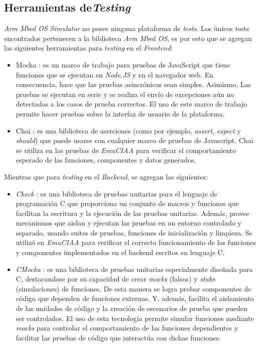 \subsection{Herramientas de\textit{Testing}}
\label{sec:TestingFrontendBackend}

\textit{Arm Mbed OS Simulator} no posee ninguna plataforma de \textit{tests}. Los únicos tests encontrados pertenecen a la biblioteca \textit{Arm Mbed OS}, es por esto que se agregan las siguientes herramientas para \textit{testing} en el \textit{Frontend}:

\begin{itemize}
     \item Mocha \citep{Mocha}: es un marco de trabajo para pruebas de JavaScript que tiene funciones que se ejecutan en \textit{Node.JS} y en el navegador web. En consecuencia, hace que las pruebas asincrónicas sean simples. Asimismo, Las pruebas se ejecutan en serie y se realiza el envío de excepciones aún no detectadas a los casos de prueba correctos.
El uso de este marco de trabajo permite hacer pruebas sobre la interfaz de usuario de la plataforma.
     
     \item Chai \citep{Chai}: es una biblioteca de aserciones (como por ejemplo, \textit{assert}, \textit{expect} y \textit{should}) que puede usarse con cualquier marco de pruebas de Javascript. Chai se utiliza en las pruebas de \textit{EmuCIAA} para  verificar el comportamiento esperado de las funciones, componentes y datos generados. 
\end{itemize}

Mientras que para \textit{testing} en el \textit{Backend}, se agregan las siguientes:

\begin{itemize}
    \item \textit{Check} \citep{Check}: es una biblioteca de pruebas unitarias para el lenguaje de programación C que proporciona un conjunto de macros y funciones que facilitan la escritura y la ejecución de las pruebas unitarias. Además, provee mecanismos que aislan y ejecutan las pruebas en un entorno controlado y separado, usando suites de pruebas, funciones de inicialización y limpieza. Se utilizó en \textit{EmuCIAA} para verificar el correcto funcionamiento de las funciones y componentes implementados en el backend escritos en lenguaje C.
    
    \item \textit{CMocka} \citep{CMocka}: es una biblioteca de pruebas unitarias especialmente diseñada para C, destacandose por su capacidad de crear \textit{mocks} (falsos) y \textit{stubs} (simulaciones) de funciones. De esta manera se logra probar componentes de código que dependen de funciones externas. Y, además, facilita el aislamiento de las unidades de código y la creación de escenarios de prueba que pueden ser controlados. El uso de esta tecnología permite simular funciones mediante \textit{mocks} para controlar el comportamiento de las funciones dependientes y facilitar las pruebas de código que interactúa con dichas funciones.
\end{itemize}


